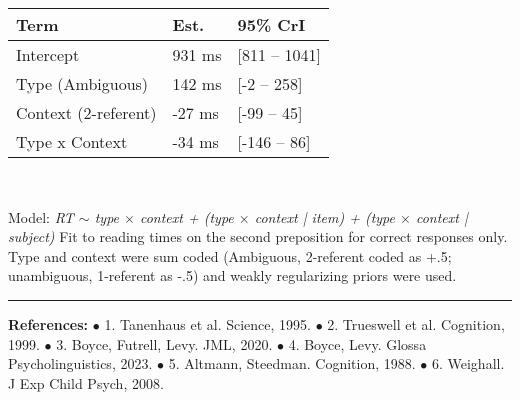 \documentclass[11pt,a4paper]{article}
\begin{document}
		\begin{minipage}{.48\textwidth}
	\begin{small}
	\begin{tabular}{|l|l|l|}
		\hline
		Term & Est. & 95\% CrI \\
		\hline
		Intercept & 931 ms & [811 -- 1041] \\
		Type (Ambiguous) & 142 ms & [-2 -- 258] \\
		Context (2-referent) & -27 ms & [-99 -- 45] \\
		Type x Context & -34 ms  & [-146 -- 86] \\
		\hline
	\end{tabular}
\end{small}
	\end{minipage}
	~~
	\begin{minipage} {.5\textwidth}\begin{small}
	Model: \textit{RT $\sim$ type $\times$ context + (type $\times$ context | item) + (type $\times$ context | subject)}
	Fit to reading times on the second preposition for correct responses only. Type and context were sum coded (Ambiguous, 2-referent coded as +.5; unambiguous, 1-referent as -.5) and weakly regularizing priors were used. 
\end{small}
	\end{minipage}

\vspace{5pt}
\rule{\textwidth}{1pt}


\begin{minipage}{\textwidth}
	\vspace{5pt}
	\begin{small} \textbf{References:} $\bullet$	
		1. Tanenhaus et al. Science, 1995. $\bullet$
		2. Trueswell et al. Cognition, 1999. $\bullet$
		3. Boyce, Futrell, Levy. JML, 2020. $\bullet$
		4. Boyce, Levy. Glossa Psycholinguistics, 2023. $\bullet$
		5. Altmann, Steedman. Cognition, 1988. $\bullet$
		6. Weighall. J Exp Child Psych, 2008.
\end{small}
\end{minipage}
\end{document}

